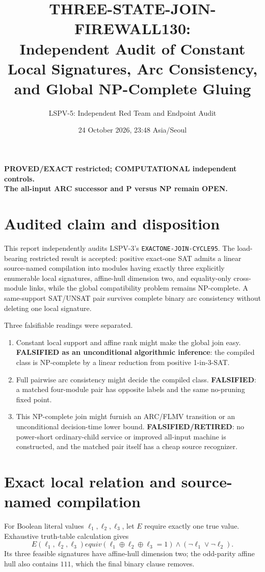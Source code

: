 \documentclass[11pt]{article}
\title{THREE-STATE-JOIN-FIREWALL130:\\Independent Audit of Constant Local Signatures, Arc Consistency, and Global NP-Complete Gluing}
\author{LSPV-5: Independent Red Team and Endpoint Audit}
\date{24 October 2026, 23:48 Asia/Seoul}
\begin{document}
\maketitle

\begin{center}
\textbf{PROVED/EXACT restricted; COMPUTATIONAL independent controls.}\\
\textbf{The all-input ARC successor and P versus NP remain OPEN.}
\end{center}

\section{Audited claim and disposition}
This report independently audits LSPV-3's
\texttt{EXACTONE-JOIN-CYCLE95}.  The load-bearing restricted result is
accepted: positive exact-one SAT admits a linear source-named compilation
into modules having exactly three explicitly enumerable local signatures,
affine-hull dimension two, and equality-only cross-module links, while the
global compatibility problem remains NP-complete.  A same-support SAT/UNSAT
pair survives complete binary arc consistency without deleting one local
signature.

Three falsifiable readings were separated.
\begin{enumerate}
\item Constant local support and affine rank might make the global join easy.
\textbf{FALSIFIED as an unconditional algorithmic inference}: the compiled
class is NP-complete by a linear reduction from positive 1-in-3-SAT.
\item Full pairwise arc consistency might decide the compiled class.
\textbf{FALSIFIED}: a matched four-module pair has opposite labels and the
same no-pruning fixed point.
\item This NP-complete join might furnish an ARC/FLMV transition or an
unconditional decision-time lower bound.  \textbf{FALSIFIED/RETIRED}: no
power-short ordinary-child service or improved all-input machine is
constructed, and the matched pair itself has a cheap source recognizer.
\end{enumerate}

\section{Exact local relation and source-named compilation}
For Boolean literal values $\ell_1,\ell_2,\ell_3$, let $E$ require exactly
one true value.  Exhaustive truth-table calculation gives
\[
 E(\ell_1,\ell_2,\ell_3)equiv
 (\ell_1\oplus\ell_2\oplus\ell_3=1)
 \land(\neg\ell_1\vee\neg\ell_2).                                  \tag{1}
\]
Its three feasible signatures have affine-hull dimension two; the odd-parity
affine hull also contains $111$, which the final binary clause removes.
\end{document}
